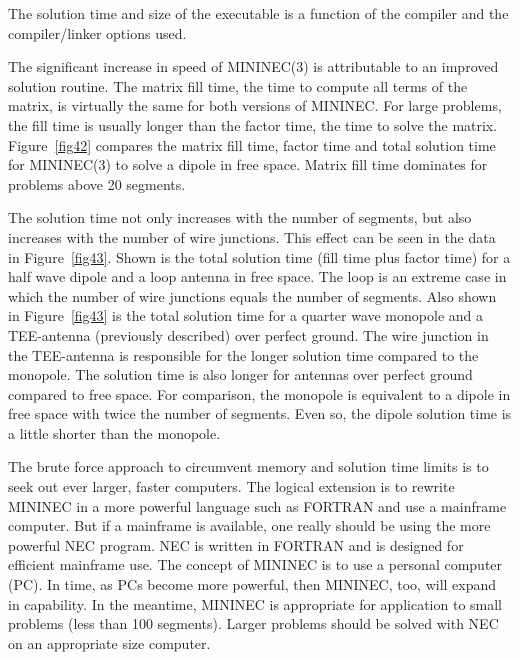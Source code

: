 \documentclass[12pt]{article}
\begin{document}
The solution time and size of the executable is a function of the
compiler and the compiler/linker options used.

The significant increase in speed of MININEC(3) is attributable to an
improved solution routine. The matrix fill time, the time to compute all
terms of the matrix, is virtually the same for both versions of MININEC.
For large problems, the fill time is usually longer than the factor
time, the time to solve the matrix. Figure~\ref{fig42} compares the
matrix fill time, factor time and total solution time for MININEC(3) to
solve a dipole in free space. Matrix fill time dominates for problems
above 20 segments.

The solution time not only increases with the number of segments, but
also increases with the number of wire junctions. This effect can be
seen in the data in Figure~\ref{fig43}. Shown is the total solution time
(fill time plus factor time) for a half wave dipole and a loop antenna
in free space. The loop is an extreme case in which the number of wire
junctions equals the number of segments. Also shown in Figure~\ref{fig43}
is the total solution time for a quarter wave monopole and a TEE-antenna
(previously described) over perfect ground. The wire junction in the
TEE-antenna is responsible for the longer solution time compared to the
monopole. The solution time is also longer for antennas over perfect
ground compared to free space. For comparison, the monopole is
equivalent to a dipole in free space with twice the number of segments.
Even so, the dipole solution time is a little shorter than the monopole.

The brute force approach to circumvent memory and solution time limits
is to seek out ever larger, faster computers. The logical extension is
to rewrite MININEC in a more powerful language such as FORTRAN and use a
mainframe computer. But if a mainframe is available, one really should
be using the more powerful NEC program. NEC is written in FORTRAN and is
designed for efficient mainframe use. The concept of MININEC is to use a
personal computer (PC). In time, as PCs become more powerful, then
MININEC, too, will expand in capability. In the meantime, MININEC is
appropriate for application to small problems (less than 100 segments).
Larger problems should be solved with NEC on an appropriate size
computer.
\end{document}
